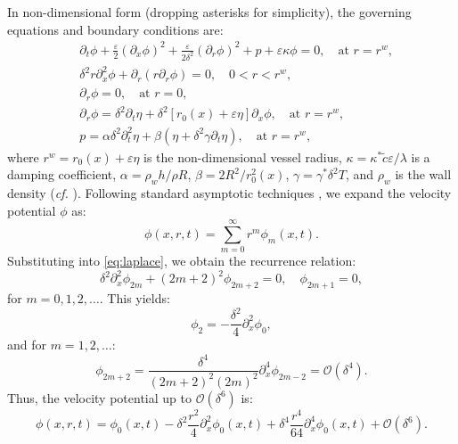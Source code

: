 \documentclass[alpha-refs, 12pt]{wiley-article}
\renewcommand{\O}{\mathcal{O}}
\begin{document}
In non-dimensional form (dropping asterisks for simplicity), the governing equations and boundary conditions are:
\begin{align}
& \partial_t \phi + \frac{\varepsilon}{2} (\partial_x \phi)^2 + \frac{\varepsilon}{2 \delta^2} (\partial_r \phi)^2 + p + \varepsilon \kappa \phi = 0, \quad \text{at } r = r^w, \label{eq:bernoulli} \\
& \delta^2 r \partial_x^2 \phi + \partial_r (r \partial_r \phi) = 0, \quad 0 < r < r^w, \label{eq:laplace} \\
& \partial_r \phi = 0, \quad \text{at } r = 0, \label{eq:center_bc} \\
& \partial_r \phi = \delta^2 \partial_t \eta + \delta^2 [r_0(x) + \varepsilon \eta] \partial_x \phi, \quad \text{at } r = r^w, \label{eq:wall_bc} \\
& p = \alpha \delta^2 \partial_t^2 \eta + \beta (\eta + \delta^2 \gamma \partial_t \eta), \quad \text{at } r = r^w, \label{eq:pressure}
\end{align}
where $r^w = r_0(x) + \varepsilon \eta$ is the non-dimensional vessel radius, $\kappa = \kappa^* \tilde{c} \varepsilon / \lambda$ is a damping coefficient, $\alpha = \rho_w h / \rho R$, $\beta = 2 R^2 / r_0^2(x)$, $\gamma = \gamma^* \delta^2 T$, and $\rho_w$ is the wall density (\emph{cf.} \cite{Mitsotakis2019}). Following standard asymptotic techniques \cite{BCS}, we expand the velocity potential $\phi$ as:
\begin{equation}\label{eq:potential}
  \phi(x, r, t) = \sum_{m=0}^\infty r^m \phi_m(x, t).
\end{equation}
Substituting into \eqref{eq:laplace}, we obtain the recurrence relation:
\begin{equation}\label{eq:recurr}
  \delta^2 \partial_x^2 \phi_{2m} + (2m + 2)^2 \phi_{2m+2} = 0, \quad \phi_{2m+1} = 0,
\end{equation}
for $m = 0, 1, 2, \dots$. This yields:
\begin{equation}\label{eq:phi2}
  \phi_2 = -\frac{\delta^2}{4} \partial_x^2 \phi_0,
\end{equation}
and for $m = 1, 2, \dots$:
\begin{equation}\label{eq:phim}
  \phi_{2m+2} = \frac{\delta^4}{(2m + 2)^2 (2m)^2} \partial_x^4 \phi_{2m-2} = \O(\delta^4).
\end{equation}
  Thus, the velocity potential up to $\O(\delta^6)$ is:
\begin{equation}\label{eq:potapr}
  \phi(x, r, t) = \phi_0(x, t) - \delta^2 \frac{r^2}{4} \partial_x^2 \phi_0(x, t) + \delta^4 \frac{r^4}{64} \partial_x^4 \phi_0(x, t) + \O(\delta^6).
\end{equation}
\end{document}
